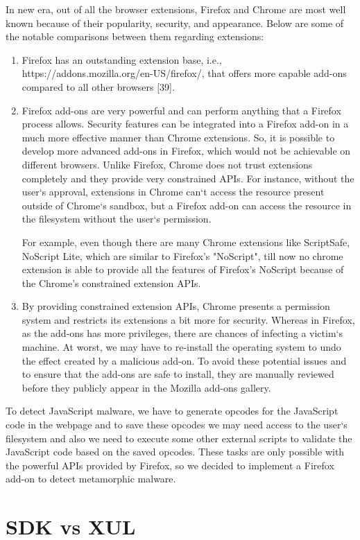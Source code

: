 In new era, out of all the browser extensions, Firefox and Chrome are most well known because of their popularity, security, and appearance. Below are some of the notable comparisons between them regarding extensions: 
\begin{enumerate}
\item Firefox has an outstanding extension base, i.e., https://addons.mozilla.org/en-US/firefox/, that offers more capable add-ons compared to all other browsers [39]. 
\item Firefox add-ons are very powerful and can perform anything that a Firefox process allows. Security features can be integrated into a Firefox add-on in a much more effective manner than Chrome extensions. So, it is possible to develop more advanced add-ons in Firefox, which would not be achievable on different browsers. Unlike Firefox, Chrome does not trust extensions completely and they provide very constrained APIs. For instance, without the user`s approval, extensions in Chrome can`t access the resource present outside of Chrome`s sandbox, but a Firefox add-on can access the resource in the filesystem without the user`s permission. 

For example, even though there are many Chrome extensions like ScriptSafe, NoScript Lite, which are similar to Firefox's "NoScript", till now no chrome extension is able to provide all the features of Firefox's NoScript because of the Chrome's constrained extension APIs.
\item By providing constrained extension APIs, Chrome presents a permission system and restricts its extensions a bit more for security. Whereas in Firefox, as the add-ons has more privileges, there are chances of infecting a victim`s machine. At worst, we may have to re-install the operating system to undo the effect created by a malicious add-on. To avoid these potential issues and to ensure that the add-ons are safe to install, they are manually reviewed before they publicly appear in the Mozilla add-ons gallery.
\end{enumerate}

To detect JavaScript malware, we have to generate opcodes for the JavaScript code in the webpage and to save these opcodes we may need access to the user`s filesystem and also we need to execute some other external scripts to validate the JavaScript code based on the saved opcodes. These tasks are only possible with the powerful APIs provided by Firefox, so we decided to implement a Firefox add-on to detect metamorphic malware.
\section{SDK vs XUL} 

